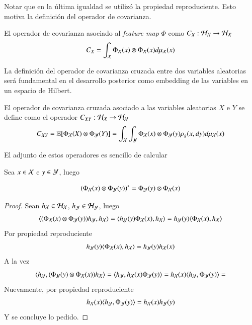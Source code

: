Notar que en la última igualdad se utilizó la propiedad reproduciente. Esto motiva la definición del operador de covarianza.
\begin{defn}
    El operador de covarianza asociado al \textit{feature map} $\Phi$ como $C_X : \mathcal{H}_{\mathcal{X}} \to \mathcal{H}_{\mathcal{X}}$ 
    \begin{equation*}
        C_X = \int_{\mathcal{X}} \Phi_{\mathcal{X}} (x) \otimes \Phi_{\mathcal{X}} (x) d \mu_{\mathcal{X}} (x)
    \end{equation*}
\end{defn}
La definición del operador de covarianza cruzada entre dos variables aleatorias será fundamental en el desarrollo posterior como embedding de las variables en un espacio de Hilbert.
\begin{defn}
    El operador de covarianza cruzada asociado a las variables aleatorias $X$ e $Y$ se define como el operador $C_{XY}: \mathcal{H}_{\mathcal{X}} \to \mathcal{H}_{\mathcal{Y}}$	
    \begin{equation*}
        C_{X Y} = \mathbb{E} [\Phi_{\mathcal{X}} (X) \otimes \Phi_{\mathcal{Y}} (Y)] = \int_{\mathcal{X}} \int_{\mathcal{Y}} \Phi_{\mathcal{X}} (x) \otimes \Phi_{\mathcal{Y}} (y) \rho_g (x, dy) d \mu_{\mathcal{X}} (x)
    \end{equation*}
\end{defn}

	El adjunto de estos operadores es sencillo de calcular
	\begin{prop}
		Sea $x \in \mathcal{X}$ e $y \in \mathcal{Y}$, luego
		
		\begin{equation*}
			\left ( \Phi_{\mathcal{X}} (x) \otimes \Phi_{\mathcal{Y}} (y) \right )^* = \Phi_{\mathcal{Y}} (y) \otimes \Phi_{\mathcal{X}} (x)
		\end{equation*}
	\end{prop}
	\begin{proof}
		Sean $h_{\mathcal{X}} \in \mathcal{H}_{\mathcal{X}}$, $h_{\mathcal{Y}} \in \mathcal{H}_{\mathcal{Y}}$, luego
		\begin{equation*}
			\langle (\Phi_{\mathcal{X}} (x) \otimes \Phi_{\mathcal{Y}} (y)) h_{\mathcal{Y}}, h_{\mathcal{X}} \rangle = \langle h_{\mathcal{Y}} (y) \Phi_{\mathcal{X}} (x), h_{\mathcal{X}} \rangle = h_{\mathcal{Y}} (y) \langle \Phi_{\mathcal{X}} (x), h_{\mathcal{X}} \rangle
		\end{equation*}
		Por propiedad reproduciente
		\begin{equation*}
			h_{\mathcal{Y}} (y) \langle  \Phi_{\mathcal{X}} (x), h_{\mathcal{X}} \rangle = h_{\mathcal{Y}} (y) h_{\mathcal{X}} (x)
		\end{equation*}
		A la vez
		\begin{equation*}
			\langle h_{\mathcal{Y}}, (\Phi_{\mathcal{Y}} (y) \otimes \Phi_{\mathcal{X}} (x)) h_{\mathcal{X}} \rangle = \langle h_{\mathcal{Y}}, h_{\mathcal{X}} (x) \Phi_{\mathcal{Y}} (y) \rangle = h_{\mathcal{X}} (x) 
			\langle h_{\mathcal{Y}}, \Phi_{\mathcal{Y}} (y) \rangle =
		\end{equation*}
		Nuevamente, por propiedad reproduciente
		\begin{equation*}
			h_{\mathcal{X}} (x) 
			\langle h_{\mathcal{Y}}, \Phi_{\mathcal{Y}} (y) \rangle =h_{\mathcal{X}} (x) h_{\mathcal{Y}} (y) 
		\end{equation*}
		Y se concluye lo pedido.
	\end{proof}
	
